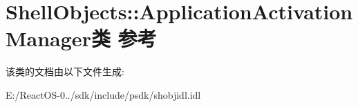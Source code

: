 \hypertarget{class_shell_objects_1_1_application_activation_manager}{}\section{Shell\+Objects\+:\+:Application\+Activation\+Manager类 参考}
\label{class_shell_objects_1_1_application_activation_manager}


该类的文档由以下文件生成\+:\begin{DoxyCompactItemize}
\item 
E\+:/\+React\+O\+S-\/0../sdk/include/psdk/shobjidl.\+idl\end{DoxyCompactItemize}
